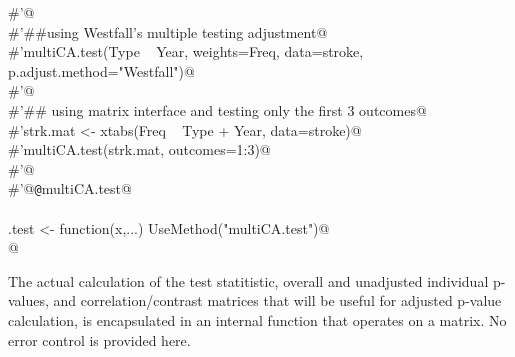 \documentclass[reqno]{amsart}
\begin{document}
\begin{flushleft}
\begin{minipage}{\linewidth}
\begin{list}{}{}
\mbox{}\verb@#'@\\
\mbox{}\verb@#'##using Westfall's multiple testing adjustment@\\
\mbox{}\verb@#'multiCA.test(Type ~ Year, weights=Freq, data=stroke, p.adjust.method="Westfall")@\\
\mbox{}\verb@#'@\\
\mbox{}\verb@#'## using matrix interface and testing only the first 3 outcomes@\\
\mbox{}\verb@#'strk.mat <- xtabs(Freq ~ Type + Year, data=stroke)@\\
\mbox{}\verb@#'multiCA.test(strk.mat, outcomes=1:3)@\\
\mbox{}\verb@#'@\\
\mbox{}\verb@#'@{\tt @}\verb@name multiCA.test@\\
\mbox{}\verb@@\\
\mbox{}\verb@multiCA.test <- function(x,...) UseMethod("multiCA.test")@\\
\mbox{}\verb@ @\\
\mbox{}\verb@@{\NWsep}
\end{list}
\vspace{-1.5ex}
\footnotesize
\begin{list}{}{\setlength{\itemsep}{-\parsep}\setlength{\itemindent}{-\leftmargin}}

\item{}
\end{list}
\end{minipage}\vspace{4ex}
\end{flushleft}
The actual calculation of the test statitistic, overall and unadjusted individual p-values,
and correlation/contrast matrices that will be useful for adjusted p-value calculation,
 is encapsulated in an internal function that operates on a matrix. No error control is provided here.
\end{document}
